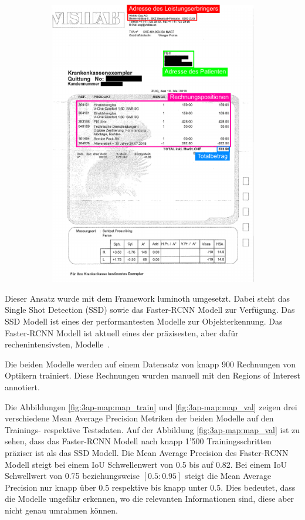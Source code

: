 \begin{figure}[H]
\begin{subfigure}[t]{0.5\linewidth}
    \includegraphics[scale=1]{graphics/roi-example-scan.pdf}
    \vspace{2ex}
  \end{subfigure}
\end{figure}

Dieser Ansatz wurde mit dem Framework luminoth umgesetzt. Dabei steht das Single Shot Detection (SSD) sowie das Faster-RCNN Modell zur Verfügung. Das SSD Modell ist eines der performantesten Modelle zur Objekterkennung. Das Faster-RCNN Modell ist aktuell eines der präzisesten, aber dafür rechenintensivsten, Modelle~\autocite{SSDFRCNN}.

Die beiden Modelle werden auf einem Datensatz von knapp 900 Rechnungen von Optikern trainiert. Diese Rechnungen wurden manuell mit den Regions of Interest annotiert.

Die Abbildungen \ref{fig:3ap-map:map_train} und \ref{fig:3ap-map:map_val} zeigen drei verschiedene Mean Average Precision Metriken der beiden Modelle auf den Trainings- respektive Testsdaten. Auf der Abbildung \ref{fig:3ap-map:map_val} ist zu sehen, dass das Faster-RCNN Modell nach knapp 1'500 Trainingsschritten präziser ist als das SSD Modell. Die Mean Average Precision des Faster-RCNN Modell steigt bei einem IoU Schwellenwert von 0.5 bis auf 0.82. Bei einem IoU Schwellwert von 0.75 beziehungsweise $[0.5:0.95]$ steigt die Mean Average Precision nur knapp über 0.5 respektive bis knapp unter 0.5. Dies bedeutet, dass die Modelle ungefähr erkennen, wo die relevanten Informationen sind, diese aber nicht genau umrahmen können.

